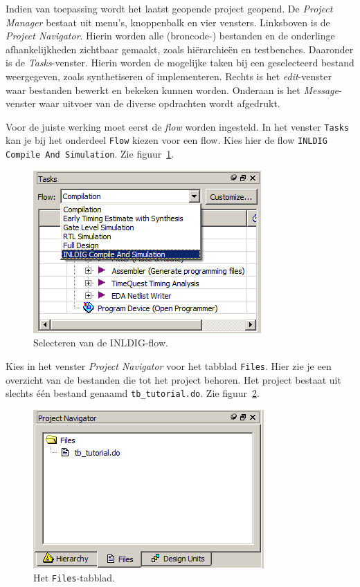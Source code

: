 \documentclass[a4paper,12pt,fleqn,twoside]{book}
\def\tutpicscale{0.455}
\newcommand{\naam}[1]{\texttt{#1}}
\begin{document}
Indien van toepassing wordt het laatst geopende project geopend. De
\textsl{Project Manager} bestaat uit menu's, knoppenbalk en vier vensters.
Linksboven is de \textsl{Project Navigator}. Hierin worden alle (broncode-)%
bestanden en de onderlinge afhankelijkheden zichtbaar gemaakt, zoals
hi\"{e}rarchie\"{e}n en testbenches. Daaronder is de \textsl{Tasks}-venster.
Hierin worden de mogelijke taken bij een geselecteerd bestand weergegeven,
zoals synthetiseren of implementeren. Rechts is het \textsl{edit}-venster
waar bestanden bewerkt en bekeken kunnen worden. Onderaan is het
\textsl{Message}-venster waar uitvoer van de diverse opdrachten wordt
afgedrukt.

Voor de juiste werking moet eerst de \textsl{flow} worden ingesteld. In het
venster \naam{Tasks} kan je bij het onderdeel \naam{Flow} kiezen voor een
flow. Kies hier de flow \naam{INLDIG Compile And Simulation}.
Zie figuur~\ref{fig:013chooseinldigflow}.

\begin{figure}[H]
\centering
\includegraphics[scale=\tutpicscale]{013chooseinldigflow}
\caption{Selecteren van de INLDIG-flow.}
\label{fig:013chooseinldigflow}
\end{figure}

Kies in het venster \textsl{Project Navigator} voor het tabblad \naam{Files}.
Hier zie je een overzicht van de bestanden die tot het project behoren. Het
project bestaat uit slechts \'{e}\'{e}n bestand genaamd
\lstinline|tb_tutorial.do|. Zie figuur~\ref{fig:014selectfilestab}.

\begin{figure}[H]
\centering
\includegraphics[scale=\tutpicscale]{014selectfilestab}
\caption{Het \lstinline|Files|-tabblad.}
\label{fig:014selectfilestab}
\end{figure}
\end{document}
